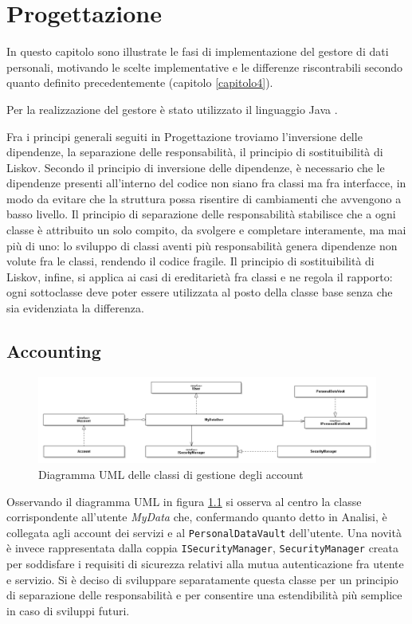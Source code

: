 \chapter{Progettazione}
\label{capitolo5}
\thispagestyle{empty}

\noindent In questo capitolo sono illustrate le fasi di implementazione del gestore di dati personali, motivando le scelte implementative e le differenze riscontrabili secondo quanto definito precedentemente (capitolo \ref{capitolo4}).

Per la realizzazione del gestore \`e stato utilizzato il linguaggio Java \cite{javalanguagespecs} \cite{java8api}.

Fra i principi generali seguiti in Progettazione troviamo l’inversione delle dipendenze, la separazione delle responsabilit\`a, il principio di sostituibilit\`a di Liskov. Secondo il principio di inversione delle dipendenze, \`e necessario che le dipendenze presenti all’interno del codice non siano fra classi ma fra interfacce, in modo da evitare che la struttura possa risentire di cambiamenti che avvengono a basso livello. Il principio di separazione delle responsabilit\`a stabilisce che a ogni classe \`e attribuito un solo compito, da svolgere e completare interamente, ma mai pi\`u di uno: lo sviluppo di classi aventi pi\`u responsabilit\`a genera dipendenze non volute fra le classi, rendendo il codice fragile. Il principio di sostituibilit\`a di Liskov, infine, si applica ai casi di ereditariet\`a fra classi e ne regola il rapporto: ogni sottoclasse deve poter essere utilizzata al posto della classe base senza che sia evidenziata la differenza.

\section{Accounting}
\label{sec:P-accounting}
\begin{figure} [h]
	\includegraphics[width=\linewidth]{pictures/Accounting-closed.png}
	\caption{Diagramma UML delle classi di gestione degli account}
	\label{fig:Accounting-closed}
\end{figure}
Osservando il diagramma UML in figura \ref{fig:Accounting-closed} si osserva al centro la classe corrispondente all’utente \textit{MyData} che, confermando quanto detto in Analisi, \`e collegata agli account dei servizi e al \texttt{PersonalDataVault} dell’utente. Una novit\`a \`e invece rappresentata dalla coppia \texttt{ISecurityManager}, \texttt{SecurityManager} creata per soddisfare i requisiti di sicurezza relativi alla mutua autenticazione fra utente e servizio. Si \`e deciso di sviluppare separatamente questa classe per un principio di separazione delle responsabilit\`a e per consentire una estendibilit\`a pi\`u semplice in caso di sviluppi futuri.

